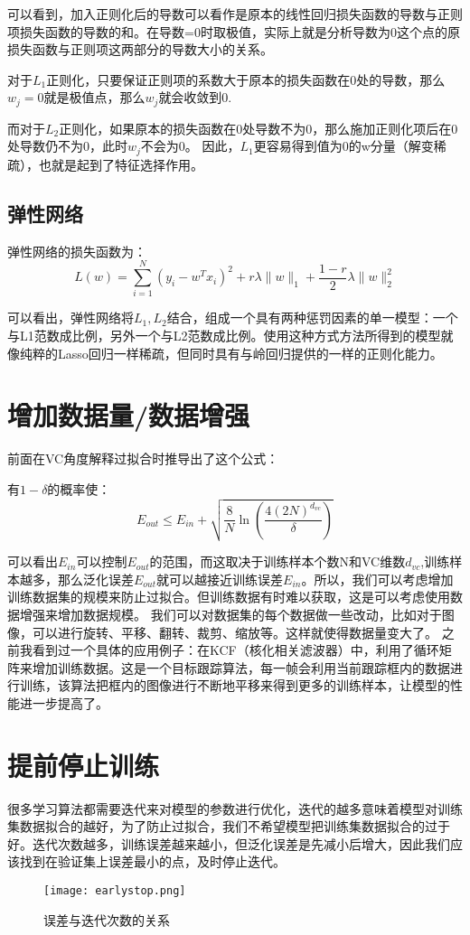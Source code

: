 \documentclass[forprint]{report}
\begin{document}
可以看到，加入正则化后的导数可以看作是原本的线性回归损失函数的导数与正则项损失函数的导数的和。在导数=0时取极值，实际上就是分析导数为0这个点的原损失函数与正则项这两部分的导数大小的关系。

对于$L_1$正则化，只要保证正则项的系数大于原本的损失函数在0处的导数，那么$w_j=0$就是极值点，那么$w_j$就会收敛到0.

而对于$L_2$正则化，如果原本的损失函数在0处导数不为0，那么施加正则化项后在0处导数仍不为0，此时$w_j$不会为0。
因此，$L_1$更容易得到值为0的w分量（解变稀疏），也就是起到了特征选择作用。

\subsection{弹性网络}
弹性网络的损失函数为：
$$
L\left( w \right) =\sum_{i=1}^N{\left( y_i-w^Tx_i \right) ^2+r\lambda \lVert w \rVert _1+\frac{1-r}{2}\lambda \lVert w \rVert _{2}^{2}}
$$

可以看出，弹性网络将$L_1,L_2$结合，组成一个具有两种惩罚因素的单一模型：一个与L1范数成比例，另外一个与L2范数成比例。使用这种方式方法所得到的模型就像纯粹的Lasso回归一样稀疏，但同时具有与岭回归提供的一样的正则化能力。
\section{增加数据量/数据增强}
前面在VC角度解释过拟合时推导出了这个公式：

\noindent
有$1-\delta$的概率使：
$$
E_{out}\leqslant E_{in}+\sqrt{\frac{8}{N}\ln \left( \frac{4\left( 2N \right) ^{d_{vc}}}{\delta} \right)}
$$

可以看出$E_{in}$可以控制$E_{out}$的范围，而这取决于训练样本个数N和VC维数$d_{vc}$,训练样本越多，那么泛化误差$E_{out}$就可以越接近训练误差$E_{in}$。所以，我们可以考虑增加训练数据集的规模来防止过拟合。但训练数据有时难以获取，这是可以考虑使用数据增强来增加数据规模。
我们可以对数据集的每个数据做一些改动，比如对于图像，可以进行旋转、平移、翻转、裁剪、缩放等。这样就使得数据量变大了。
之前我看到过一个具体的应用例子：在KCF（核化相关滤波器）中，利用了循环矩阵来增加训练数据。这是一个目标跟踪算法，每一帧会利用当前跟踪框内的数据进行训练，该算法把框内的图像进行不断地平移来得到更多的训练样本，让模型的性能进一步提高了。
\section{提前停止训练}
很多学习算法都需要迭代来对模型的参数进行优化，迭代的越多意味着模型对训练集数据拟合的越好，为了防止过拟合，我们不希望模型把训练集数据拟合的过于好。迭代次数越多，训练误差越来越小，但泛化误差是先减小后增大，因此我们应该找到在验证集上误差最小的点，及时停止迭代。
\begin{figure}[ht]
	\centering
	\texttt{[image: earlystop.png]}
	\caption{误差与迭代次数的关系}
	\label{fig:1}
\end{figure}
\end{document}
